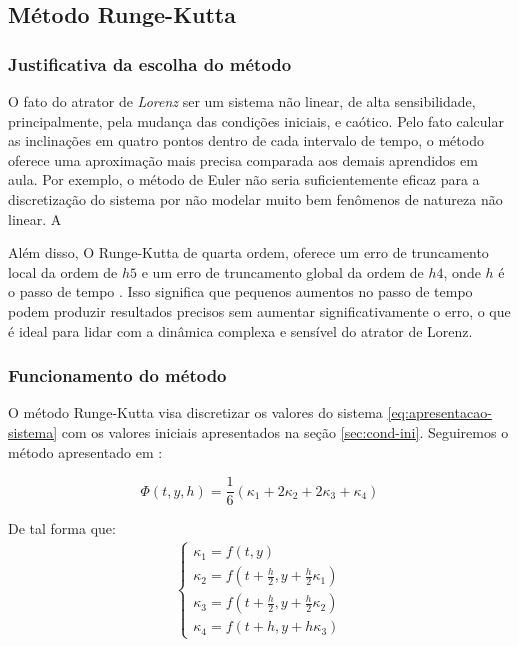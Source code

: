 \documentclass[12pt, a4paper]{article}
\begin{document}
\subsection{Método Runge-Kutta}
\subsubsection{Justificativa da escolha do método}
O fato do atrator de \textit{Lorenz} ser um sistema não linear, de alta
sensibilidade, principalmente, pela mudança das condições iniciais, e caótico.
Pelo fato calcular as inclinações em quatro pontos dentro de cada intervalo de
tempo, o método oferece uma aproximação mais precisa comparada aos demais
aprendidos em aula. Por exemplo, o método de Euler não seria suficientemente
eficaz para a discretização do sistema por não modelar muito bem fenômenos de
natureza não linear. A

Além disso, O Runge-Kutta de quarta ordem, oferece um erro de
truncamento local da ordem de $h5$ e um erro de truncamento global da ordem de
$h4$, onde $h$ é o passo de tempo \cite{burden2016} \cite{roma2023}. Isso
significa que pequenos aumentos no passo de tempo podem produzir resultados
precisos sem aumentar significativamente o erro, o que é ideal para lidar com a
dinâmica complexa e sensível do atrator de Lorenz.

\subsubsection{Funcionamento do método}
O método Runge-Kutta visa discretizar os valores do sistema
\eqref{eq:apresentacao-sistema} com os valores iniciais apresentados na seção
\ref{sec:cond-ini}. Seguiremos o método apresentado em \cite{roma2023}:

\begin{equation}
    \Phi(t, y, h) = \frac{1}{6} (\kappa_1 + 2\kappa_2 + 2\kappa_3 +
    \kappa_4)
\end{equation}

De tal forma que:
\begin{align}
    \begin{cases}
        \kappa_1 = f(t, y)         \\
        \kappa_2 = f\left(t + \frac{h}{2}, y +
        \frac{h}{2}\kappa_1\right) \\
        \kappa_3 = f\left(t + \frac{h}{2}, y +
        \frac{h}{2}\kappa_2\right) \\
        \kappa_4 = f(t + h, y + h\kappa_3)
    \end{cases}
\end{align}
\end{document}
